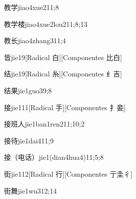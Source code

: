 \begin{verbete}{教学}{jiao4xue2}{11;8}
\end{verbete}

\begin{verbete}{教学楼}{jiao4xue2lou2}{11;8;13}
\end{verbete}

\begin{verbete}{教长}{jiao4zhang3}{11;4}
\end{verbete}

\begin{verbete}{皆}{jie1}{9}[Radical 白][Componentes 比白]
\end{verbete}

\begin{verbete}{结}{jie1}{9}[Radical 糸][Componentes 纟吉]
\end{verbete}

\begin{verbete}{结果}{jie1guo3}{9;8}
\end{verbete}

\begin{verbete}{接}{jie1}{11}[Radical 手][Componentes 扌妾]
\end{verbete}

\begin{verbete}{接班人}{jie1ban1ren2}{11;10;2}
\end{verbete}

\begin{verbete}{接待}{jie1dai4}{11;9}
\end{verbete}

\begin{verbete}{接（电话）}{jie1(dian4hua4)}{11;5;8}
\end{verbete}

\begin{verbete}{街}{jie1}{12}[Radical 行][Componentes 亍圭彳]
\end{verbete}

\begin{verbete}{街舞}{jie1wu3}{12;14}
\end{verbete}

